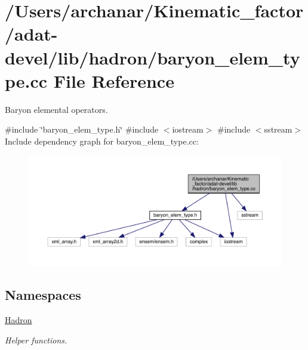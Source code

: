 \hypertarget{adat-devel_2lib_2hadron_2baryon__elem__type_8cc}{}\section{/\+Users/archanar/\+Kinematic\+\_\+factor/adat-\/devel/lib/hadron/baryon\+\_\+elem\+\_\+type.cc File Reference}
\label{adat-devel_2lib_2hadron_2baryon__elem__type_8cc}


Baryon elemental operators.  


{\ttfamily \#include \char`\"{}baryon\+\_\+elem\+\_\+type.\+h\char`\"{}}\newline
{\ttfamily \#include $<$iostream$>$}\newline
{\ttfamily \#include $<$sstream$>$}\newline
Include dependency graph for baryon\+\_\+elem\+\_\+type.\+cc\+:
\nopagebreak
\begin{figure}[H]
\begin{center}
\leavevmode
\includegraphics[width=350pt]{de/d14/adat-devel_2lib_2hadron_2baryon__elem__type_8cc__incl}
\end{center}
\end{figure}
\subsection*{Namespaces}
\begin{DoxyCompactItemize}
\item 
 \mbox{\hyperlink{namespaceHadron}{Hadron}}
\begin{DoxyCompactList}\small\item\em Helper functions. \end{DoxyCompactList}\end{DoxyCompactItemize}
